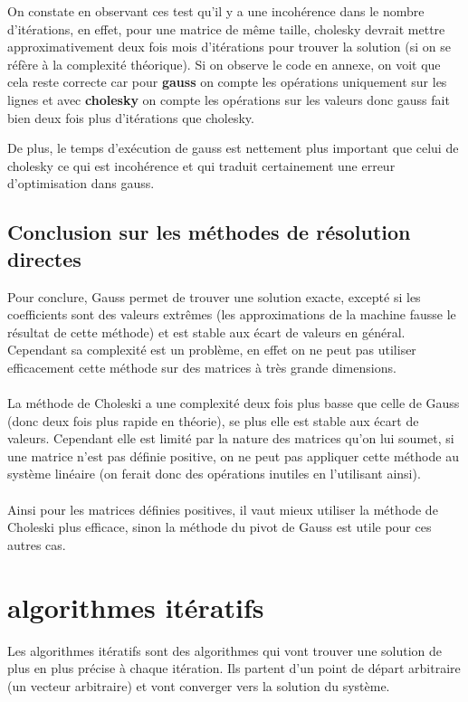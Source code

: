 \documentclass[a4paper]{article}
\begin{document}
\begin{itemize}
  On constate en observant ces test qu'il y a une incohérence dans le nombre
  d'itérations, en effet, pour une matrice de même taille, cholesky devrait
  mettre approximativement deux fois mois d'itérations pour trouver la solution
  (si on se réfère à la complexité théorique). Si on observe le code en annexe,
  on voit que cela reste correcte car pour \textbf{gauss} on compte les
  opérations uniquement sur les lignes et avec \textbf{cholesky} on compte les
  opérations sur les valeurs donc gauss fait bien deux fois plus d'itérations
  que cholesky.

  De plus, le temps d’exécution de gauss est nettement plus important que celui
  de cholesky ce qui est incohérence et qui traduit certainement une erreur
  d'optimisation dans gauss.
\end{itemize}

\subsection{Conclusion sur les méthodes de résolution directes}

 Pour conclure, Gauss permet de trouver une solution exacte, excepté si les
 coefficients sont des valeurs extrêmes (les approximations de la machine fausse
 le résultat de cette méthode) et est stable aux écart de valeurs en
 général. Cependant sa complexité est un problème, en effet on ne peut pas
 utiliser efficacement cette méthode sur des matrices à très grande dimensions.
 \\
 \\
 La méthode de Choleski a une complexité deux fois plus basse que celle de
 Gauss (donc deux fois plus rapide en théorie), se plus elle est stable aux
 écart de valeurs. Cependant elle est limité par la nature des matrices qu'on
 lui soumet, si une matrice n'est pas définie positive, on ne peut pas appliquer
 cette méthode au système linéaire (on ferait donc des opérations inutiles en
 l'utilisant ainsi).
 \\
 \\
 Ainsi pour les matrices définies positives, il vaut
 mieux utiliser la méthode de Choleski plus efficace, sinon la méthode du pivot
 de Gauss est utile pour ces autres cas.

\section{algorithmes itératifs}

Les algorithmes itératifs sont des algorithmes qui vont trouver une solution de
plus en plus précise à chaque itération. Ils partent d'un point de départ
arbitraire (un vecteur arbitraire) et vont converger vers la solution du
système.
\end{document}

